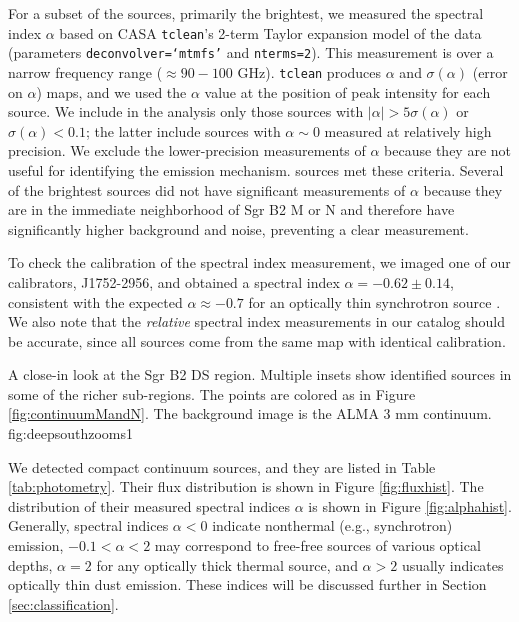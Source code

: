 \documentclass[twocolumn]{aastex61}
\begin{document}

For a subset of the sources, primarily the brightest, we measured the spectral
index $\alpha$ based on CASA \texttt{tclean}'s  2-term Taylor expansion model
of the data (parameters \texttt{deconvolver=`mtmfs'} and \texttt{nterms=2}).
This measurement is over a narrow frequency range ($\approx90-100$ GHz).
\texttt{tclean} produces $\alpha$ and $\sigma(\alpha)$ (error on $\alpha$)
maps, and we used the $\alpha$ value at the position of peak intensity for each
source.  We include in the analysis only those sources with $|\alpha| > 5
\sigma(\alpha)$ or $\sigma(\alpha) < 0.1$; the latter include sources with
$\alpha\sim0$ measured at relatively high precision.  We exclude the lower-precision
measurements of $\alpha$ because they are not useful for identifying the emission
mechanism.  \nalphas sources met these
criteria. Several of the brightest sources did not have significant
measurements of $\alpha$ because they are in the immediate neighborhood of Sgr
B2 M or N and therefore have significantly higher background and noise,
preventing a clear measurement.

To check the calibration of the spectral index measurement, we imaged one of
our calibrators, J1752-2956, and obtained a spectral index
$\alpha=-0.62\pm0.14$, consistent with the expected $\alpha\approx-0.7$ for an
optically thin synchrotron source \citep[e.g.,][]{Condon2007a}.  We also note
that the \emph{relative} spectral index measurements in our catalog should be
accurate, since all sources come from the same map with identical calibration.

{A close-in look at the Sgr B2 DS region.  Multiple insets show identified sources
in some of the richer sub-regions.  The points are colored as in Figure
\ref{fig:continuumMandN}.  The background image is the ALMA 3 mm continuum.}
{fig:deepsouthzooms}{1}{\textwidth}

We detected \ncores compact continuum sources, and they are listed
in Table \ref{tab:photometry}.  Their flux distribution is
shown in Figure \ref{fig:fluxhist}.  The distribution of their measured
spectral indices $\alpha$ is shown in Figure \ref{fig:alphahist}.
Generally, spectral indices $\alpha<0$ indicate nonthermal (e.g., synchrotron)
emission, $-0.1<\alpha<2$ may correspond to free-free sources of various
optical depths, $\alpha=2$ for any optically thick thermal source,
and $\alpha>2$ usually indicates optically thin dust emission.  These indices
will be discussed further in Section \ref{sec:classification}.
\end{document}

